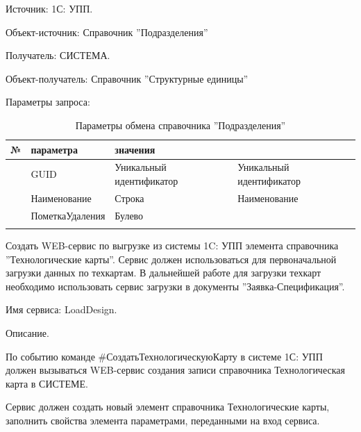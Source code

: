 Источник: 1С: УПП.

Объект-источник: Справочник ''Подразделения'' 

Получатель: СИСТЕМА.

Объект-получатель: Справочник ''Структурные единицы''

Параметры запроса:
\pc
\scriptsize
\begin{longtable}{|p{10mm}|p{35mm}|p{40mm}|p{60mm}|}
\hline
\parbox[c][5mm]{10mm}{\centering№} & \parbox[c]{35mm}{ параметра} & \parbox[c]{40mm}{ значения} & \parbox[c]{60mm}{} \\
\hline
\parbox[c][5mm]{16mm}{\p} & GUID & Уникальный идентификатор & Уникальный идентификатор \\
\hline
\parbox[c][5mm]{16mm}{\p} & Наименование &     Строка & Наименование \\
\hline
\parbox[c][5mm]{16mm}{\p} & ПометкаУдаления & Булево & \\
\hline

\caption{Параметры обмена справочника ''Подразделения''}\label{ex:workers}
\end{longtable}  
\normalsize




\label{ex:LoadDesign}

Создать WEB-сервис по выгрузке из системы 1C: УПП элемента справочника ''Технологические карты''.
Сервис должен использоваться для первоначальной загрузки данных по техкартам. 
В дальнейшей работе для загрузки техкарт необходимо использовать сервис загрузки в документы ''Заявка-Спецификация''.

Имя сервиса: LoadDesign.

Описание.

По событию команде \#СоздатьТехнологическуюКарту в системе 1С: УПП должен вызываться WEB-сервис создания записи справочника Технологическая карта в СИСТЕМЕ.

Сервис должен создать новый элемент справочника Технологические карты, заполнить свойства элемента параметрами, переданными на вход сервиса.

